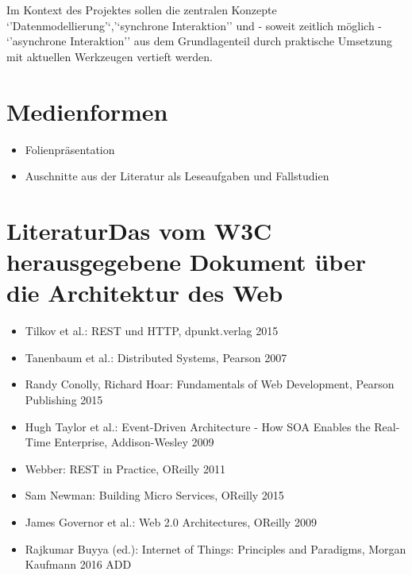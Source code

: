 Im Kontext des Projektes sollen die zentralen Konzepte
`'Datenmodellierung'`,'`synchrone Interaktion'' und - soweit zeitlich
möglich - `'asynchrone Interaktion'' aus dem Grundlagenteil durch
praktische Umsetzung mit aktuellen Werkzeugen vertieft werden.

\hypertarget{medienformenpathlabelmi-2017modulbeschreibungen-bachelorba_grundlagen-des-web}{%
\section*{Medienformen\label{/mi-2017/modulbeschreibungen-bachelor/BA_Grundlagen-des-web}}\label{medienformenpathlabelmi-2017modulbeschreibungen-bachelorba_grundlagen-des-web}}

\begin{itemize}
\tightlist
\item
  Folienpräsentation
\item
  Auschnitte aus der Literatur als Leseaufgaben und Fallstudien
\end{itemize}

\hypertarget{literaturdas-vom-w3c-herausgegebene-dokument-uxfcber-die-architektur-des-webpathlabelmi-2017modulbeschreibungen-bachelorba_grundlagen-des-web}{%
\section*{LiteraturDas vom W3C herausgegebene Dokument über die
Architektur des
Web\label{/mi-2017/modulbeschreibungen-bachelor/BA_Grundlagen-des-web}}\label{literaturdas-vom-w3c-herausgegebene-dokument-uxfcber-die-architektur-des-webpathlabelmi-2017modulbeschreibungen-bachelorba_grundlagen-des-web}}

\begin{itemize}
\tightlist
\item
  Tilkov et al.: REST und HTTP, dpunkt.verlag 2015
\item
  Tanenbaum et al.: Distributed Systems, Pearson 2007
\item
  Randy Conolly, Richard Hoar: Fundamentals of Web Development, Pearson
  Publishing 2015
\item
  Hugh Taylor et al.: Event-Driven Architecture - How SOA Enables the
  Real-Time Enterprise, Addison-Wesley 2009
\item
  Webber: REST in Practice, OReilly 2011
\item
  Sam Newman: Building Micro Services, OReilly 2015
\item
  James Governor et al.: Web 2.0 Architectures, OReilly 2009
\item
  Rajkumar Buyya (ed.): Internet of Things: Principles and Paradigms,
  Morgan Kaufmann 2016 ADD
\end{itemize}

